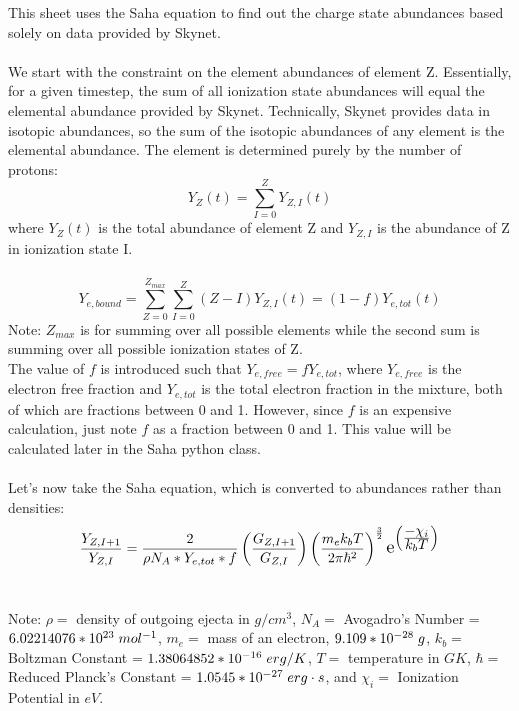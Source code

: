 \documentclass[11pt,a4paper]{article}
\begin{document}
\maketitle This sheet uses the Saha equation to find out the charge state abundances based solely on data provided by Skynet.
\\\\
We start with the constraint on the element abundances of element Z. Essentially, for a given timestep, the sum of all ionization state abundances will equal the elemental abundance provided by Skynet. Technically, Skynet provides data in isotopic abundances, so the sum of the isotopic abundances of any element is the elemental abundance. The element is determined purely by the number of protons:
$$Y_Z (t) = \sum_{I=0}^{Z} Y_{Z,I}(t)$$
where $Y_Z (t)$ is the total abundance of element Z and $Y_{Z,I}$ is the abundance of Z in ionization state I.
\\\\
$$Y_{e,bound} = \sum_{Z=0}^{Z_{max}} \sum_{I=0}^{Z} (Z - I) Y_{Z,I}(t) = (1-f) Y_{e,tot}(t) $$
Note: $Z_{max}$ is for summing over all possible elements while the second sum is summing over all possible ionization states of Z. 
\\The value of $f$ is introduced such that $Y_{e,free} = f Y_{e,tot}$, where $Y_{e,free}$ is the electron free fraction and $Y_{e,tot}$ is the total electron fraction in the mixture, both of which are fractions between 0 and 1. However, since $f$ is an expensive calculation, just note $f$ as a fraction between 0 and 1. This value will be calculated later in the Saha python class. 
\\\\Let's now take the Saha equation, which is converted to abundances rather than densities: $$\frac{Y_{Z,I+1}}{Y_{Z,I}}  = \frac{2}{\rho N_A * Y_{e,tot}*f}  \left(\frac{G_{Z,I+1}}{G_{Z,I}}\right) \left(\frac{m_e k_b T}{2\pi\hbar^2}\right)^\frac{3}{2} \scalebox{1.3} e^{\left(\frac{\displaystyle -\chi_i}{\displaystyle k_b T}\right)} $$ \

Note: $\rho = $ density of outgoing ejecta in $g/cm^3$, $N_A = $ Avogadro's Number = $6.02214076*10^{23} \hspace{.1 cm} mol^{-1}$, $m_e = $ mass of an electron, $9.109 * 10^{-28} \hspace{.1 cm} g $, $k_b = $ Boltzman Constant = $1.38064852 * 10^{-16} \hspace{.1 cm} erg/K$, $T = $ temperature in $GK$, $\hbar = $ Reduced Planck's Constant = $1.0545 * 10^{-27} \hspace{.1cm} erg \cdot s$, and $\chi_i = $ Ionization Potential in $eV$.\\
 
\end{document}
